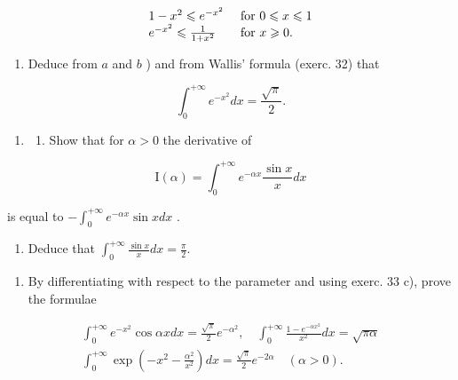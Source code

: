 \[
\begin{array}{l l} 1 - x ^ {2} \leqslant e ^ {- x ^ {2}} & \text { for } 0 \leqslant x \leqslant 1 \\ e ^ {- x ^ {2}} \leqslant \frac {1}{1 + x ^ {2}} & \text { for } x \geqslant 0. \end{array}
\]

\begin{enumerate}
\def\labelenumi{\alph{enumi})}
\setcounter{enumi}{2}
\tightlist
\item
  Deduce from \(a\) and \(b\) ) and from Wallis' formula (exerc. 32) that
\end{enumerate}

\[
\int_ {0} ^ {+ \infty} e ^ {- x ^ {2}} d x = \frac {\sqrt {\pi}}{2}.
\]

\begin{enumerate}
\def\labelenumi{\arabic{enumi})}
\setcounter{enumi}{33}
\tightlist
\item
  \begin{enumerate}
  \def\labelenumii{\alph{enumii})}
  \tightlist
  \item
    Show that for \(\alpha > 0\) the derivative of
  \end{enumerate}
\end{enumerate}

\[
\mathrm{I} (\alpha) = \int_ {0} ^ {+ \infty} e ^ {- \alpha x} \frac {\sin x}{x} d x
\]

is equal to \(-\int_{0}^{+\infty}e^{-\alpha x}\sin x dx\) .

\begin{enumerate}
\def\labelenumi{\alph{enumi})}
\setcounter{enumi}{1}
\tightlist
\item
  Deduce that \(\int_0^{+\infty}\frac{\sin x}{x} dx = \frac{\pi}{2}.\)
\end{enumerate}

\begin{enumerate}
\def\labelenumi{\arabic{enumi})}
\setcounter{enumi}{34}
\tightlist
\item
  By differentiating with respect to the parameter and using exerc. 33 c), prove the formulae
\end{enumerate}

\[
\begin{array}{l} \int_ {0} ^ {+ \infty} e ^ {- x ^ {2}} \cos \alpha x d x = \frac {\sqrt {\pi}}{2} e ^ {- \alpha^ {2}}, \quad \int_ {0} ^ {+ \infty} \frac {1 - e ^ {- \alpha x ^ {2}}}{x ^ {2}} d x = \sqrt {\pi \alpha} \\ \int_ {0} ^ {+ \infty} \exp \left(- x ^ {2} - \frac {\alpha^ {2}}{x ^ {2}}\right) d x = \frac {\sqrt {\pi}}{2} e ^ {- 2 \alpha} \quad (\alpha > 0). \end{array}
\]

